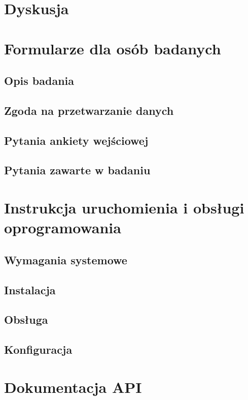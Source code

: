 \documentclass{./assets/wfis}
\begin{document}



\chapter{Dyskusja}\label{dyskusja}

\printbibliography

\clearpage
\listoffigures
\clearpage
\listoftables
\clearpage

\appendix
\chapter{Formularze dla osób badanych}\label{formularz-dla-osoby-badanej}
\section{Opis badania}\label{opis-badania}
\section{Zgoda na przetwarzanie danych}\label{zgoda-na-przetwarzanie-danych}
\section{Pytania ankiety wejściowej}\label{pytania-ankiety-wejsciowej}
\section{Pytania zawarte w badaniu}\label{pytania-badania}
\chapter{Instrukcja uruchomienia i obsługi oprogramowania}\label{instrukcja}
\section{Wymagania systemowe}
\section{Instalacja}
\section{Obsługa}
\section{Konfiguracja}
\chapter{Dokumentacja API}\label{api}
\end{document}
